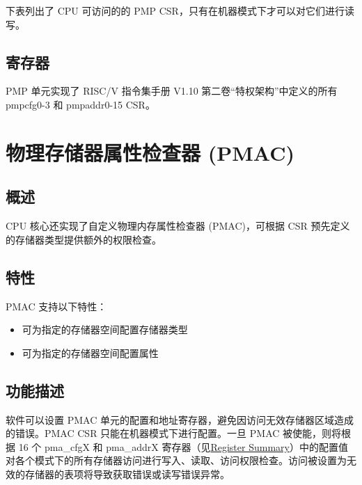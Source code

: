 \documentclass[main\_\_CN.tex]{subfiles}
\begin{document}
下表列出了 CPU 可访问的的 PMP CSR，只有在机器模式下才可以对它们进行读写。




\subsection{寄存器}
\label{sec:riscvcpu-pmp-reg-desc}

PMP 单元实现了 RISC\-/V 指令集手册 V1.10 第二卷“特权架构”中定义的所有 pmpcfg0-3 和 pmpaddr0-15 CSR。

\clearpage
\section{物理存储器属性检查器 (PMAC)}
\label{sec:riscvcpu-pma}

\subsection{概述}
\label{sec:riscvcpu-pma-overview}
CPU 核心还实现了自定义物理内存属性检查器 (PMAC)，可根据 CSR 预先定义的存储器类型提供额外的权限检查。

\subsection{特性}
\label{sec:riscvcpu-pma-features}

PMAC 支持以下特性：

\begin{itemize}
    \item 可为指定的存储器空间配置存储器类型
    \item 可为指定的存储器空间配置属性
\end{itemize}

\subsection{功能描述}
\label{sec:riscvcpu-pma-func-descr}

软件可以设置 PMAC 单元的配置和地址寄存器，避免因访问无效存储器区域造成的错误。PMAC CSR 只能在机器模式下进行配置。一旦 PMAC 被使能，则将根据 16 个 pma\_cfgX 和 pma\_addrX 寄存器（见\hyperref[sec:riscvcpu-pma-reg-summ]{Register Summary}）中的配置值对各个模式下的所有存储器访问进行写入、读取、访问权限检查。访问被设置为无效的存储器的表项将导致获取错误或读写错误异常。
\end{document}
